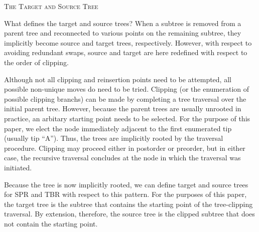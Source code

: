 \documentclass[12pt,letterpaper]{article}
\renewcommand{\section}[1]{%
\bigskip
\begin{center}
\begin{Large}
\normalfont\scshape #1
\medskip
\end{Large}
\end{center}}
\begin{document}
\section{The Target and Source Tree}
What defines the target and source trees? 
When a subtree is removed from a parent tree and reconnected to various points on the remaining subtree, they implicitly become source and target trees, respectively.
However, with respect to avoiding redundant swaps, source and target are here redefined with respect to the order of clipping. 

Although not all clipping and reinsertion points need to be attempted, all possible non-unique moves do need to be tried. 
Clipping (or the enumeration of possible clipping branchs) can be made by completing a tree traversal over the initial parent tree.
However, because the parent trees are usually unrooted in practice, an arbitary starting point needs to be selected.
For the purpose of this paper, we elect the node immediately adjacent to the first enumerated tip (usually tip ``A'').
Thus, the trees are implicitly rooted by the traversal procedure.
Clipping may proceed either in postorder or preorder, but in either case, the recursive traversal concludes at the node in which the traversal was initiated.

Because the tree is now implicitly rooted, we can define target and source trees for SPR and TBR with respect to this pattern.
For the purposes of this paper, the target tree is the subtree that contains the starting point of the tree-clipping traversal.
By extension, therefore, the source tree is the clipped subtree that does not contain the starting point.

\end{document}
